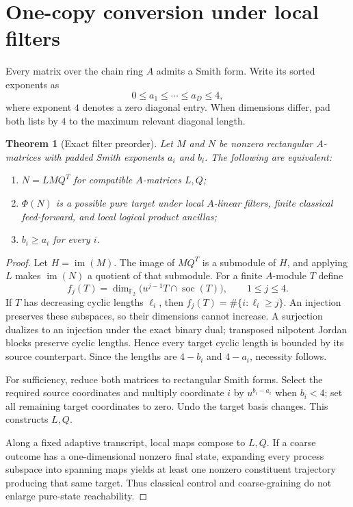 \documentclass[11pt]{article}
\newtheorem{theorem}{Theorem}[section]
\theoremstyle{definition}
\theoremstyle{remark}
\newcommand{\F}{\mathbb F_2}
\newcommand{\soc}{\operatorname{soc}}
\newcommand{\im}{\operatorname{im}}
\begin{document}
\section{One-copy conversion under local filters}

Every matrix over the chain ring $A$ admits a Smith form. Write its sorted exponents as
\[
  0\le a_1\le\cdots\le a_D\le4,
\]
where exponent $4$ denotes a zero diagonal entry. When dimensions differ, pad both lists by $4$ to the maximum relevant diagonal length.

\begin{theorem}[Exact filter preorder]\label{thm:filter}
Let $M$ and $N$ be nonzero rectangular $A$-matrices with padded Smith exponents $a_i$ and $b_i$. The following are equivalent:
\begin{enumerate}
  \item $N=LMQ^T$ for compatible $A$-matrices $L,Q$;
  \item $\Phi(N)$ is a possible pure target under local $A$-linear filters, finite classical feed-forward, and local logical product ancillas;
  \item $b_i\ge a_i$ for every $i$.
\end{enumerate}
\end{theorem}

\begin{proof}
Let $H=\im(M)$. The image of $MQ^T$ is a submodule of $H$, and applying $L$ makes $\im(N)$ a quotient of that submodule. For a finite $A$-module $T$ define
\[
  f_j(T)=\dim_{\F}\bigl(u^{j-1}T\cap\soc(T)\bigr),\qquad 1\le j\le4.
\]
If $T$ has decreasing cyclic lengths $\ell_i$, then
$f_j(T)=\#\{i:\ell_i\ge j\}$. An injection preserves these subspaces, so their dimensions cannot increase. A surjection dualizes to an injection under the exact binary dual; transposed nilpotent Jordan blocks preserve cyclic lengths. Hence every target cyclic length is bounded by its source counterpart. Since the lengths are $4-b_i$ and $4-a_i$, necessity follows.

For sufficiency, reduce both matrices to rectangular Smith forms. Select the required source coordinates and multiply coordinate $i$ by $u^{b_i-a_i}$ when $b_i<4$; set all remaining target coordinates to zero. Undo the target basis changes. This constructs $L,Q$.

Along a fixed adaptive transcript, local maps compose to $L,Q$. If a coarse outcome has a one-dimensional nonzero final state, expanding every process subspace into spanning maps yields at least one nonzero constituent trajectory producing that same target. Thus classical control and coarse-graining do not enlarge pure-state reachability.
\end{proof}
\end{document}
